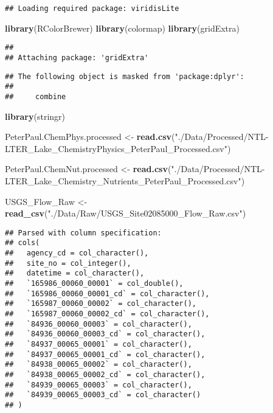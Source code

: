 \documentclass[]{article}
\newenvironment{Shaded}{\begin{snugshade}}{\end{snugshade}}
\newcommand{\KeywordTok}[1]{\textcolor[rgb]{0.13,0.29,0.53}{\textbf{#1}}}
\newcommand{\StringTok}[1]{\textcolor[rgb]{0.31,0.60,0.02}{#1}}
\newcommand{\NormalTok}[1]{#1}
\begin{document}
\begin{verbatim}
## Loading required package: viridisLite
\end{verbatim}

\begin{Shaded}
\begin{Highlighting}[]
\KeywordTok{library}\NormalTok{(RColorBrewer)}
\KeywordTok{library}\NormalTok{(colormap)}
\KeywordTok{library}\NormalTok{(gridExtra)}
\end{Highlighting}
\end{Shaded}

\begin{verbatim}
## 
## Attaching package: 'gridExtra'
\end{verbatim}

\begin{verbatim}
## The following object is masked from 'package:dplyr':
## 
##     combine
\end{verbatim}

\begin{Shaded}
\begin{Highlighting}[]
\KeywordTok{library}\NormalTok{(stringr)}

\NormalTok{PeterPaul.ChemPhys.processed <-}\StringTok{ }\KeywordTok{read.csv}\NormalTok{(}\StringTok{"./Data/Processed/NTL-LTER_Lake_ChemistryPhysics_PeterPaul_Processed.csv"}\NormalTok{) }


\NormalTok{PeterPaul.ChemNut.processed <-}\StringTok{ }\KeywordTok{read.csv}\NormalTok{(}\StringTok{"./Data/Processed/NTL-LTER_Lake_Chemistry_Nutrients_PeterPaul_Processed.csv"}\NormalTok{)}


\NormalTok{USGS_Flow_Raw <-}\StringTok{ }\KeywordTok{read_csv}\NormalTok{(}\StringTok{"./Data/Raw/USGS_Site02085000_Flow_Raw.csv"}\NormalTok{)}
\end{Highlighting}
\end{Shaded}

\begin{verbatim}
## Parsed with column specification:
## cols(
##   agency_cd = col_character(),
##   site_no = col_integer(),
##   datetime = col_character(),
##   `165986_00060_00001` = col_double(),
##   `165986_00060_00001_cd` = col_character(),
##   `165987_00060_00002` = col_character(),
##   `165987_00060_00002_cd` = col_character(),
##   `84936_00060_00003` = col_character(),
##   `84936_00060_00003_cd` = col_character(),
##   `84937_00065_00001` = col_character(),
##   `84937_00065_00001_cd` = col_character(),
##   `84938_00065_00002` = col_character(),
##   `84938_00065_00002_cd` = col_character(),
##   `84939_00065_00003` = col_character(),
##   `84939_00065_00003_cd` = col_character()
## )
\end{verbatim}
\end{document}
